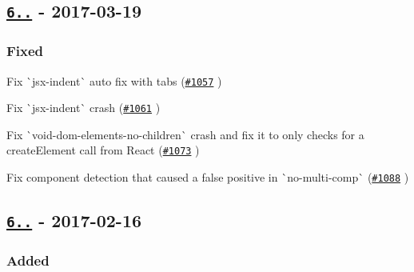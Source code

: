 \subsection*{\href{https://github.com/yannickcr/eslint-plugin-react/compare/v6.10.0...v6.10.1}{\tt 6..} -\/ 2017-\/03-\/19}

\subsubsection*{Fixed}


\begin{DoxyItemize}
\item Fix \`{}jsx-\/indent\`{} auto fix with tabs (\href{https://github.com/yannickcr/eslint-plugin-react/issues/1057}{\tt \#1057}  )
\item Fix \`{}jsx-\/indent\`{} crash (\href{https://github.com/yannickcr/eslint-plugin-react/issues/1061}{\tt \#1061} )
\item Fix \`{}void-\/dom-\/elements-\/no-\/children\`{} crash and fix it to only checks for a create\+Element call from React (\href{https://github.com/yannickcr/eslint-plugin-react/issues/1073}{\tt \#1073} )
\item Fix component detection that caused a false positive in \`{}no-\/multi-\/comp\`{} (\href{https://github.com/yannickcr/eslint-plugin-react/issues/1088}{\tt \#1088} )
\end{DoxyItemize}

\subsection*{\href{https://github.com/yannickcr/eslint-plugin-react/compare/v6.9.0...v6.10.0}{\tt 6..} -\/ 2017-\/02-\/16}

\subsubsection*{Added}


